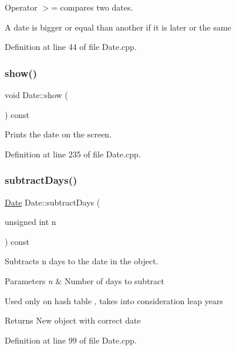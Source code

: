Operator $>$= compares two dates. 

A date is bigger or equal than another if it is later or the same 

Definition at line 44 of file Date.\+cpp.

\hypertarget{class_date_a37f8fc7ca1692df7a8b265099c061721}{}\label{class_date_a37f8fc7ca1692df7a8b265099c061721} 
\subsubsection{\texorpdfstring{show()}{show()}}
{\footnotesize\ttfamily void Date\+::show (\begin{DoxyParamCaption}{ }\end{DoxyParamCaption}) const}



Prints the date on the screen. 



Definition at line 235 of file Date.\+cpp.

\hypertarget{class_date_a16e8cb570b74e2d7a7050b53c0767542}{}\label{class_date_a16e8cb570b74e2d7a7050b53c0767542} 
\subsubsection{\texorpdfstring{subtract\+Days()}{subtractDays()}}
{\footnotesize\ttfamily \hyperlink{class_date}{Date} Date\+::subtract\+Days (\begin{DoxyParamCaption}\item[{unsigned int}]{n }\end{DoxyParamCaption}) const}



Subtracts n days to the date in the object. 


\begin{DoxyParams}{Parameters}
{\em n} & Number of days to subtract\\
\hline
\end{DoxyParams}
Used only on hash table , takes into consideration leap years

\begin{DoxyReturn}{Returns}
New object with correct date 
\end{DoxyReturn}


Definition at line 99 of file Date.\+cpp.

